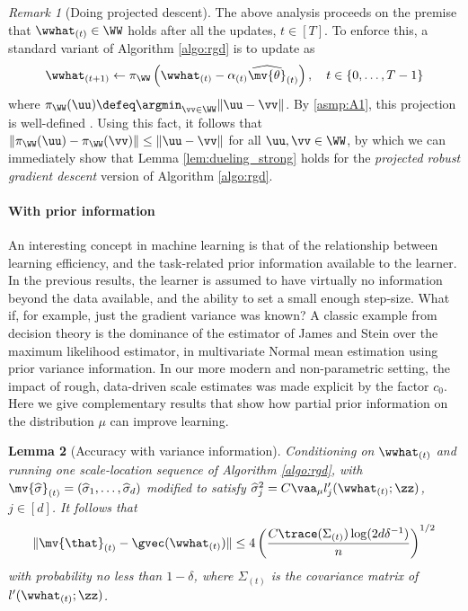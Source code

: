 \documentclass[11pt,oneside]{article}
\theoremstyle{definition} \newtheorem{defn}{Definition}       %
\theoremstyle{plain} \newtheorem{prop}[defn]{Proposition}           %
\theoremstyle{plain} \newtheorem{thm}[defn]{Theorem}                %
\theoremstyle{plain} \newtheorem{lem}[defn]{Lemma}                  %
\theoremstyle{plain} \newtheorem{cor}[defn]{Corollary}              %
\theoremstyle{remark} \newtheorem{rmk}[defn]{Remark}                %
\theoremstyle{remark} \newtheorem{ex}[defn]{Example}                %
\begin{document}
\begin{rmk}[Doing projected descent]
The above analysis proceeds on the premise that $\wwhat_{(t)} \in \WW$ holds after all the updates, $t \in [T]$. To enforce this, a standard variant of Algorithm \ref{algo:rgd} is to update as
%
\begin{align*}
\wwhat_{(t+1)} \gets \pi_{\WW}\left( \wwhat_{(t)} - \alpha_{(t)}\widehat{\mv{\theta}}_{(t)} \right), \quad t \in \{0,\ldots,T-1\}
\end{align*}
%
where $\pi_{\WW}(\uu) \defeq \argmin_{\vv \in \WW}\|\uu-\vv\|$. By \ref{asmp:A1}, this projection is well-defined \citep[Sec.~3.12, Thm.~3.12]{luenberger1969Book}. Using this fact, it follows that $\|\pi_{\WW}(\uu)-\pi_{\WW}(\vv)\| \leq \|\uu-\vv\|$ for all $\uu,\vv \in \WW$, by which we can immediately show that Lemma \ref{lem:dueling_strong} holds for the \textit{projected robust gradient descent} version of Algorithm \ref{algo:rgd}.
\end{rmk}


\paragraph{With prior information}

An interesting concept in machine learning is that of the relationship between learning efficiency, and the task-related prior information available to the learner. In the previous results, the learner is assumed to have virtually no information beyond the data available, and the ability to set a small enough step-size. What if, for example, just the gradient variance was known? A classic example from decision theory is the dominance of the estimator of James and Stein over the maximum likelihood estimator, in multivariate Normal mean estimation using prior variance information. In our more modern and non-parametric setting, the impact of rough, data-driven scale estimates was made explicit by the factor $c_{0}$. Here we give complementary results that show how partial prior information on the distribution $\mu$ can improve learning.

\begin{lem}[Accuracy with variance information]\label{lem:grad_estimate_varknown}
Conditioning on $\wwhat_{(t)}$ and running one scale-location sequence of Algorithm \ref{algo:rgd}, with $\mv{\widehat{\sigma}}_{(t)}=(\widehat{\sigma}_{1},\ldots,\widehat{\sigma}_{d})$ modified to satisfy $\widehat{\sigma}_{j}^{2} = C\vaa_{\mu}l^{\prime}_{j}(\wwhat_{(t)};\zz)$, $j \in [d]$. It follows that
%
\begin{align*}
\|\mv{\that}_{(t)}-\gvec(\wwhat_{(t)})\| \leq 4\left(\frac{C\trace(\Sigma_{(t)})\log(2d\delta^{-1})}{n}\right)^{1/2}
\end{align*}
%
with probability no less than $1-\delta$, where $\Sigma_{(t)}$ is the covariance matrix of $l^{\prime}(\wwhat_{(t)};\zz)$.
\end{lem}
\end{document}
